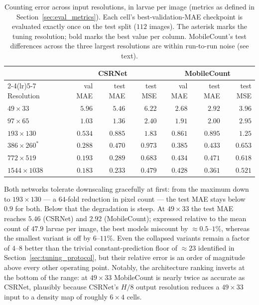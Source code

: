 \begin{table}[t]
    \centering
    \caption{Counting error across input resolutions, in larvae per
    image (metrics as defined in Section~\ref{sec:eval_metrics}). Each
    cell's best-validation-MAE checkpoint is evaluated exactly once on
    the test split ($112$ images). The asterisk marks the tuning
    resolution; bold marks the best value per column. MobileCount's
    test differences across the three largest resolutions are within
    run-to-run noise (see text).}
    \label{tab:resolution_test}
    \small
    \begin{tabular}{l rrr rrr}
        \toprule
        &\multicolumn{3}{c}{CSRNet}&\multicolumn{3}{c}{MobileCount}\\
        \cmidrule(lr){2-4}\cmidrule(lr){5-7}
        Resolution & val MAE & test MAE & test MSE & val MAE & test MAE & test MSE \\
        \midrule
        $49\times33$     & $5.96$  & $5.46$  & $6.22$  & $2.68$  & $2.92$  & $3.96$ \\
        $97\times65$     & $1.03$  & $1.36$  & $2.40$  & $1.91$  & $2.00$  & $2.95$ \\
        $193\times130$   & $0.534$ & $0.885$ & $1.83$  & $0.861$ & $0.895$ & $1.25$ \\
        $386\times260^*$ & $0.288$ & $0.470$ & $0.973$ & $\mathbf{0.385}$ & $0.433$ & $0.653$ \\
        $772\times519$   & $0.193$ & $0.289$ & $0.683$ & $0.434$ & $0.471$ & $0.618$ \\
        $1544\times1038$ & $\mathbf{0.183}$ & $\mathbf{0.233}$ & $\mathbf{0.479}$ & $0.428$ & $\mathbf{0.361}$ & $\mathbf{0.521}$ \\
        \bottomrule
    \end{tabular}
\end{table}

Both networks tolerate downscaling gracefully at first: from the
maximum down to $193\times130$ — a $64$-fold reduction in pixel count
— the test MAE stays below $0.9$ for both. Below that the degradation
is steep. At $49\times33$ the test MAE reaches $5.46$ (CSRNet) and
$2.92$ (MobileCount); expressed relative to the mean count of $47.9$
larvae per image, the best models miscount by ${\approx}0.5$--$1\%$,
whereas the smallest variant is off by $6$--$11\%$. Even the collapsed
variants remain a factor of $4$--$8$ better than the trivial
constant-prediction floor of ${\approx}23$ identified in
Section~\ref{sec:tuning_protocol}, but their relative error is an
order of magnitude above every other operating point. Notably, the
architecture ranking inverts at the bottom of the range: at
$49\times33$ MobileCount is nearly twice as accurate as CSRNet,
plausibly because CSRNet's $H/8$ output resolution reduces a
$49\times33$ input to a density map of roughly $6\times4$ cells.

